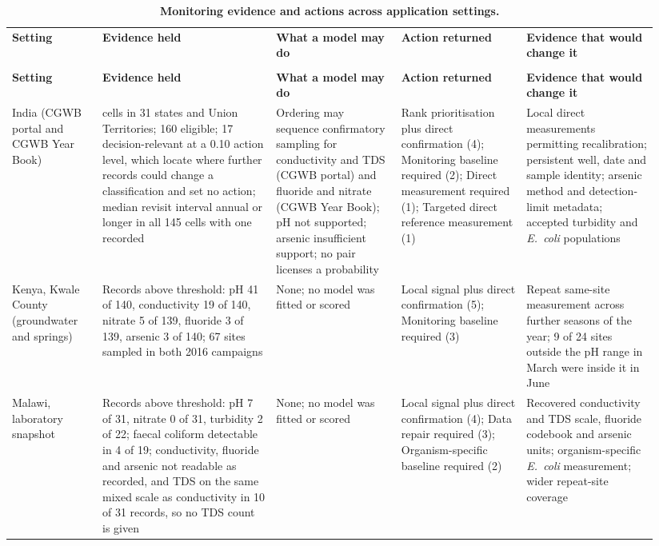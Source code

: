 \documentclass[10pt,letterpaper]{article}
\newlength\savedwidth
\newcommand\thickhline{\noalign{\global\savedwidth\arrayrulewidth\global\arrayrulewidth 2pt}%
\hline
\noalign{\global\arrayrulewidth\savedwidth}}
\begin{document}
\nolinenumbers
\begin{spacing}{1}
{\footnotesize\setlength{\tabcolsep}{3pt}\setlength{\LTcapwidth}{\linewidth}
\begin{longtable}{>{\raggedright\arraybackslash}p{0.1323\linewidth}>{\raggedright\arraybackslash}p{0.2523\linewidth}>{\raggedright\arraybackslash}p{0.1800\linewidth}>{\raggedright\arraybackslash}p{0.1800\linewidth}>{\raggedright\arraybackslash}p{0.1923\linewidth}}
\caption{\textbf{Monitoring evidence and actions across application settings.}}\label{table4} \\
\hline
\textbf{Setting} & \textbf{Evidence held} & \textbf{What a model may do} & \textbf{Action returned} & \textbf{Evidence that would change it} \\ \thickhline
\endfirsthead
\multicolumn{5}{@{}l}{\footnotesize\emph{Table 4. (continued)}} \\
\hline
\textbf{Setting} & \textbf{Evidence held} & \textbf{What a model may do} & \textbf{Action returned} & \textbf{Evidence that would change it} \\ \thickhline
\endhead
India (CGWB portal and CGWB Year Book) & 186 cells in 31 states and Union Territories; 160 eligible; 17 decision-relevant at a 0.10 action level, which locate where further records could change a classification and set no action; median revisit interval annual or longer in all 145 cells with one recorded & Ordering may sequence confirmatory sampling for conductivity and TDS (CGWB portal) and fluoride and nitrate (CGWB Year Book); pH not supported; arsenic insufficient support; no pair licenses a probability & Rank prioritisation plus direct confirmation (4); Monitoring baseline required (2); Direct measurement required (1); Targeted direct reference measurement (1) & Local direct measurements permitting recalibration; persistent well, date and sample identity; arsenic method and detection-limit metadata; accepted turbidity and \textit{E.~coli} populations \\ \hline
Kenya, Kwale County (groundwater and springs) & Records above threshold: pH 41 of 140, conductivity 19 of 140, nitrate 5 of 139, fluoride 3 of 139, arsenic 3 of 140; 67 sites sampled in both 2016 campaigns & None; no model was fitted or scored & Local signal plus direct confirmation (5); Monitoring baseline required (3) & Repeat same-site measurement across further seasons of the year; 9 of 24 sites outside the pH range in March were inside it in June \\ \hline
Malawi, laboratory snapshot & Records above threshold: pH 7 of 31, nitrate 0 of 31, turbidity 2 of 22; faecal coliform detectable in 4 of 19; conductivity, fluoride and arsenic not readable as recorded, and TDS on the same mixed scale as conductivity in 10 of 31 records, so no TDS count is given & None; no model was fitted or scored & Local signal plus direct confirmation (4); Data repair required (3); Organism-specific baseline required (2) & Recovered conductivity and TDS scale, fluoride codebook and arsenic units; organism-specific \textit{E.~coli} measurement; wider repeat-site coverage \\ \hline

\end{longtable}}
\end{spacing}
\end{document}
